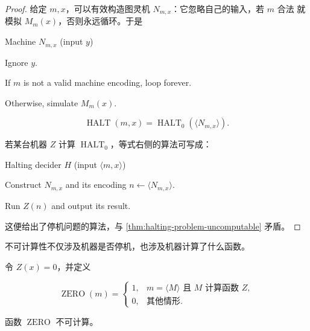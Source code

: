 \begin{proof}
  给定 $m,x$，可以有效构造图灵机 $N_{m,x}$：它忽略自己的输入，若 $m$ 合法
  就模拟 $M_m(x)$，否则永远循环。于是

  \begin{pseudocode}{Machine $N_{m,x}$ (input $y$)}
    \item Ignore $y$.
    \item If $m$ is not a valid machine encoding, loop forever.
    \item Otherwise, simulate $M_m(x)$.
  \end{pseudocode}

  \[
    \operatorname{HALT}(m,x)
      =\operatorname{HALT}_0(\langle N_{m,x}\rangle).
  \]

  若某台机器 $Z$ 计算 $\operatorname{HALT}_0$，等式右侧的算法可写成：

  \begin{pseudocode}{Halting decider $H$ (input $\langle m,x\rangle$)}
    \item Construct $N_{m,x}$ and its encoding $n\gets\langle N_{m,x}\rangle$.
    \item Run $Z(n)$ and output its result.
  \end{pseudocode}

  这便给出了停机问题的算法，与
  \cref{thm:halting-problem-uncomputable} 矛盾。
\end{proof}

不可计算性不仅涉及机器是否停机，也涉及机器计算了什么函数。

\begin{example}[识别常零函数]
  \label{ex:zero-function-uncomputable}
  令 $Z(x)=0$，并定义

  \[
    \operatorname{ZERO}(m)=
    \begin{cases}
      1,&m=\langle M\rangle\text{ 且 }M\text{ 计算函数 }Z,\\
      0,&\text{其他情形}.
    \end{cases}
  \]

  函数 $\operatorname{ZERO}$ 不可计算。
\end{example}


